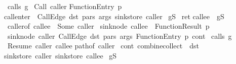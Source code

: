 \begin{isabelle}
\isaindent{\ \ \ \ \ \ \ \ \ \ \ }{\isasymin}\ calls\ g\isanewline
\isaindent{\ \ \ \ \ }{\isasymLongrightarrow}\ Call\ caller\isanewline
\isaindent{\ \ \ \ \ \ \ \ \ \ \ }\isacharbrackleft{}\isacharparenleft{}FunctionEntry\ p\isacharcomma{}\isanewline
\isaindent{\ \ \ \ \ \ \ \ \ \ \ \ \ }call\isacharunderscore{}enter\ {\isasymG}\ \isacharparenleft{}CallEdge\ dst\ pars\ args\isacharparenright{}\ \isacharparenleft{}sink\isacharunderscore{}store\ caller\isacharparenright{}\isacharparenright{}\isacharbrackright{}\isanewline
\isaindent{\ \ \ \ \ \ \ \ \ }{\isasymin}\ {\isasymT}\isactrlbsub {\isasymG}\isacharcomma{}g\isacharcomma{}S\isactrlesub{}\isachardoublequote{}\isanewline
\isacharbar{}\ ret\isacharcolon{}\isanewline
\isaindent{\ \ \ \ }\isachardoublequote{}callee\ {\isasymin}\ {\isasymT}\isactrlbsub {\isasymG}\isacharcomma{}g\isacharcomma{}S\isactrlesub{}\isanewline
\isaindent{\ \ \ \ \ }{\isasymLongrightarrow}\ caller\isacharunderscore{}of\ callee\ \isacharequal{}\ Some\ caller\isanewline
\isaindent{\ \ \ \ \ }{\isasymLongrightarrow}\ sink\isacharunderscore{}node\ callee\ \isacharequal{}\ FunctionResult\ p\isanewline
\isaindent{\ \ \ \ \ }{\isasymLongrightarrow}\ \isacharparenleft{}sink\isacharunderscore{}node\ caller\isacharcomma{}\ CallEdge\ dst\ pars\ args\isacharcomma{}\ FunctionEntry\ p\isacharcomma{}\ cont\isacharparenright{}\isanewline
\isaindent{\ \ \ \ \ \ \ \ \ \ \ }{\isasymin}\ calls\ g\isanewline
\isaindent{\ \ \ \ \ }{\isasymLongrightarrow}\ Resume\ caller\ callee\isanewline
\isaindent{\ \ \ \ \ \ \ \ \ \ \ }\isacharparenleft{}path\isacharunderscore{}of\ caller\isanewline
\isaindent{\ \ \ \ \ \ \ \ \ \ \ \ \ \ }\isacharat{}\ \isacharbrackleft{}\isacharparenleft{}cont\isacharcomma{}\ combine\isacharunderscore{}collect\ {\isasymG}\ dst\isanewline
\isaindent{\ \ \ \ \ \ \ \ \ \ \ \ \ \ \ \ \ \ \ \ \ \ \ \ \ \ }\isacharparenleft{}sink\isacharunderscore{}store\ caller\isacharparenright{}\ \isacharparenleft{}sink\isacharunderscore{}store\ callee\isacharparenright{}\isacharparenright{}\isacharbrackright{}\isacharparenright{}\isanewline
\isaindent{\ \ \ \ \ \ \ \ \ }{\isasymin}\ {\isasymT}\isactrlbsub {\isasymG}\isacharcomma{}g\isacharcomma{}S\isactrlesub{}\isachardoublequote{}
\end{isabelle}
